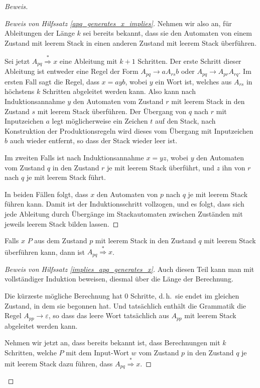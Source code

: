 \begin{proof}[Beweis]
\begin{proof}[Beweis von Hilfssatz \ref{apq_generates_x_implies}]
Nehmen wir also an, für Ableitungen der Länge $k$ sei bereits
bekannt, dass sie den Automaten von einem Zustand mit leerem Stack
in einen anderen Zustand mit leerem Stack überführen.

Sei jetzt $A_{pq}\overset{*}{\Rightarrow}x$ eine Ableitung mit $k+1$
Schritten.
Der erste Schritt dieser Ableitung ist entweder eine
Regel der Form $A_{pq}\to aA_{rs}b$ oder $A_{pq}\to A_{pr}A_{rq}$.
Im ersten Fall sagt die Regel, dass $x=ayb$, wobei $y$ ein
Wort ist, welches aus $A_{rs}$ in höchstens $k$ Schritten abgeleitet
werden kann.
Also kann nach Induktionsannahme $y$ den Automaten vom
Zustand $r$ mit leerem Stack in den Zustand $s$ mit leerem Stack
überführen.
Der Übergang von $q$ nach $r$ mit Inputzeichen $a$
legt möglicherweise ein Zeichen $t$ auf den Stack, nach Konstruktion
der Produktionsregeln wird dieses vom Übergang mit Inputzeichen $b$
auch wieder entfernt, so dass der Stack wieder leer ist.

Im zweiten Falls ist nach Induktionsannahme $x=yz$, wobei $y$ den
Automaten vom Zustand $q$ in den Zustand $r$ je mit leerem Stack
überführt, und $z$ ihn von $r$ nach $q$ je mit leerem Stack
führt.

In beiden Fällen folgt, dass $x$ den Automaten von $p$
nach $q$ je mit leerem Stack führen kann.
Damit ist der Induktionsschritt vollzogen, und es folgt, dass
sich jede Ableitung durch Übergänge im Stackautomaten zwischen
Zuständen mit jeweils leerem Stack bilden lassen.
\end{proof}

\begin{hilfssatz}\label{implies_apq_generates_x}
Falls $x$ $P$ aus dem Zustand $p$ mit leerem Stack in den Zustand
$q$ mit leerem Stack überführen kann, dann ist
$A_{pq}\overset{*}{\Rightarrow} x$.
\end{hilfssatz}

\begin{proof}[Beweis von Hilfssatz \ref{implies_apq_generates_x}]
Auch diesen Teil kann man mit vollständiger Induktion beweisen,
diesmal über die Länge der Berechnung.

Die kürzeste mögliche Berechnung hat $0$ Schritte, d.\,h.~sie endet
im gleichen Zustand, in dem sie begonnen hat.
Und tatsächlich enthält die Grammatik die Regel $A_{pp}\to\varepsilon$, 
so dass das leere Wort tatsächlich aus $A_{pp}$ mit leerem
Stack abgeleitet werden kann.

Nehmen wir jetzt an, dass bereits bekannt ist, dass Berechnungen mit
$k$ Schritten, welche $P$ mit dem Input-Wort $w$ vom Zustand $p$
in den Zustand $q$ je mit leerem Stack dazu führen, dass
$A_{pq}\overset{*}{\Rightarrow} x$.


\end{proof}
\end{proof}
